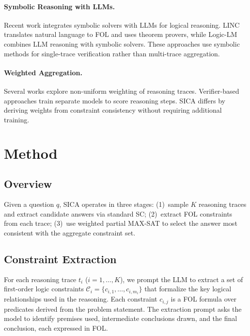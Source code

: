 \documentclass[11pt,a4paper]{article}
\begin{document}
\paragraph{Symbolic Reasoning with LLMs.}
Recent work integrates symbolic solvers with LLMs for logical reasoning. LINC \cite{olausson2023linc} translates natural language to FOL and uses theorem provers, while Logic-LM \cite{pan2023logiclm} combines LLM reasoning with symbolic solvers. These approaches use symbolic methods for single-trace verification rather than multi-trace aggregation.

\paragraph{Weighted Aggregation.}
Several works explore non-uniform weighting of reasoning traces. Verifier-based approaches \cite{cobbe2021gsm8k,lightman2023lets} train separate models to score reasoning steps. SICA differs by deriving weights from constraint consistency without requiring additional training.

\section{Method}
\label{sec:method}

\subsection{Overview}

Given a question $q$, SICA operates in three stages: (1)~sample $K$ reasoning traces and extract candidate answers via standard SC; (2)~extract FOL constraints from each trace; (3)~use weighted partial MAX-SAT to select the answer most consistent with the aggregate constraint set.

\subsection{Constraint Extraction}

For each reasoning trace $t_i$ ($i = 1, \ldots, K$), we prompt the LLM to extract a set of first-order logic constraints $\mathcal{C}_i = \{c_{i,1}, \ldots, c_{i,m_i}\}$ that formalize the key logical relationships used in the reasoning. Each constraint $c_{i,j}$ is a FOL formula over predicates derived from the problem statement. The extraction prompt asks the model to identify premises used, intermediate conclusions drawn, and the final conclusion, each expressed in FOL.
\end{document}
